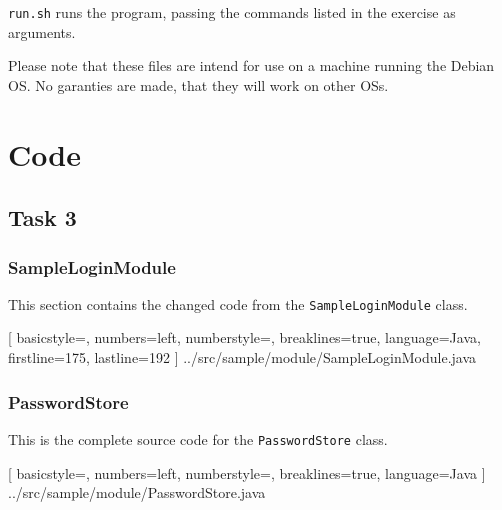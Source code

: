\documentclass{article}
\begin{document}
\texttt{run.sh} runs the program, passing the commands listed in the exercise as
arguments.

Please note that these files are intend for use on a machine running the Debian OS.
No garanties are made, that they will work on other OSs.

\newpage
\appendix

\section{Code}

\subsection{Task 3}

\subsubsection{SampleLoginModule}
\label{code:sampleloginmodule}
This section contains the changed code from the \texttt{SampleLoginModule} class.

[
	basicstyle=\footnotesize,
	numbers=left,
	numberstyle=\tiny,
	breaklines=true,
	language=Java,
	firstline=175,
	lastline=192
]
{../src/sample/module/SampleLoginModule.java}

\subsubsection{PasswordStore}
\label{code:passwordstore}
This is the complete source code for the \texttt{PasswordStore} class.

[
	basicstyle=\footnotesize,
	numbers=left,
	numberstyle=\tiny,
	breaklines=true,
	language=Java
]
{../src/sample/module/PasswordStore.java}
\end{document}
